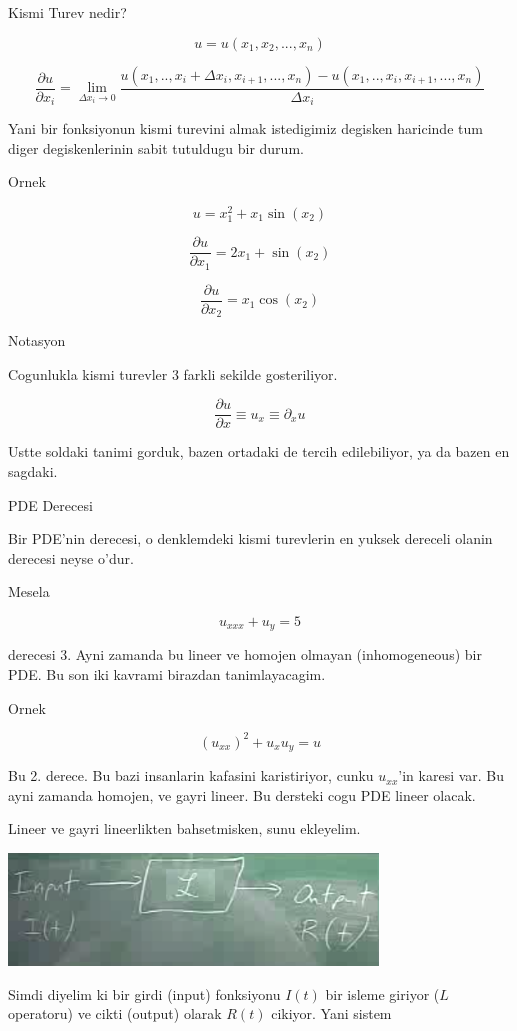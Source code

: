 \documentclass[12pt,fleqn]{article}\usepackage{../common}
\begin{document}
Kismi Turev nedir? 

\[ u = u(x_1, x_2,...,x_n) \]

\[ 
\frac{\partial u}{\partial x_i} = 
\lim_{\Delta x_i \to 0} 
\frac{
u(x_1,..,x_i+\Delta x_i,x_{i+1},...,x_n) - u(x_1,..,x_i,x_{i+1},...,x_n)}
{\Delta x_i}  \]

Yani bir fonksiyonun kismi turevini almak istedigimiz degisken haricinde
tum diger degiskenlerinin sabit tutuldugu bir durum. 

Ornek

\[ u = x_1^2 + x_1\sin(x_2) \]

\[ 
\frac{\partial u}{\partial x_1} = 2x_1 + \sin(x_2)
 \]

\[ 
\frac{\partial u}{\partial x_2} = x_1 \cos(x_2)
 \]

Notasyon

Cogunlukla kismi turevler 3 farkli sekilde gosteriliyor. 

\[ \frac{\partial u}{\partial x} \equiv u_x \equiv \partial_x u \]

Ustte soldaki tanimi gorduk, bazen ortadaki de tercih edilebiliyor, ya da
bazen en sagdaki. 

PDE Derecesi

Bir PDE'nin derecesi, o denklemdeki kismi turevlerin en yuksek dereceli
olanin derecesi neyse o'dur.

Mesela

\[ u_{xxx} + u_y = 5 \]

derecesi 3. Ayni zamanda bu lineer ve homojen olmayan (inhomogeneous) bir
PDE. Bu son iki kavrami birazdan tanimlayacagim. 

Ornek 

\[ (u_{xx})^2 + u_xu_y = u \]

Bu 2. derece. Bu bazi insanlarin kafasini karistiriyor, cunku $u_{xx}$'in
karesi var. Bu ayni zamanda homojen, ve gayri lineer. Bu dersteki cogu PDE
lineer olacak. 

Lineer ve gayri lineerlikten bahsetmisken, sunu ekleyelim. 

\includegraphics[height=3cm]{1_5.png}

Simdi diyelim ki bir girdi (input) fonksiyonu $I(t)$ bir isleme giriyor
($L$ operatoru) ve cikti (output) olarak $R(t)$ cikiyor. Yani sistem
\end{document}
